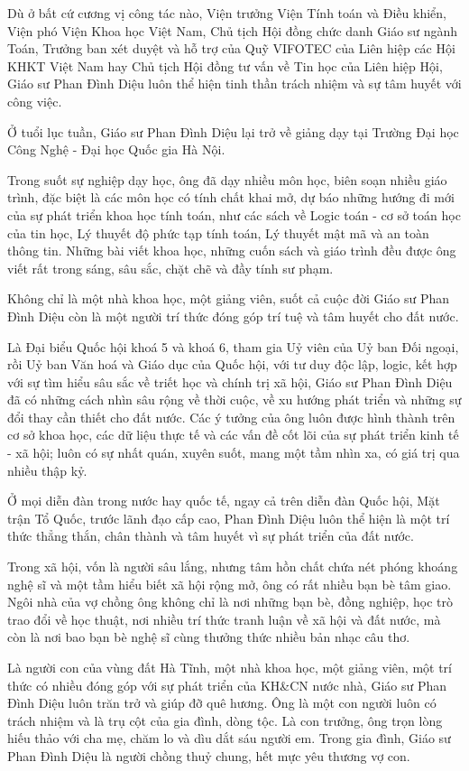 Dù ở bất cứ cương vị công tác nào, Viện trưởng Viện Tính toán và Điều khiển, Viện phó Viện Khoa học Việt Nam, Chủ tịch Hội đồng chức danh Giáo sư ngành Toán, Trưởng ban xét duyệt và hỗ trợ của Quỹ VIFOTEC của Liên hiệp các Hội KHKT Việt Nam hay Chủ tịch Hội đồng tư vấn về Tin học của Liên hiệp Hội, Giáo sư Phan Đình Diệu luôn thể hiện tinh thần trách nhiệm và sự tâm huyết với công việc.

Ở tuổi lục tuần, Giáo sư Phan Đình Diệu lại trở về giảng dạy tại Trường Đại học Công Nghệ - Đại học Quốc gia Hà Nội.

Trong suốt sự nghiệp dạy học, ông đã dạy nhiều môn học, biên soạn nhiều giáo trình, đặc biệt là các môn học có tính chất khai mở, dự báo những hướng đi mới của sự phát triển khoa học tính toán, như các sách về Logic toán - cơ sở toán học của tin học, Lý thuyết độ phức tạp tính toán, Lý thuyết mật mã và an toàn thông tin. Những bài viết khoa học, những cuốn sách và giáo trình đều được ông viết rất trong sáng, sâu sắc, chặt chẽ và đầy tính sư phạm.

Không chỉ là một nhà khoa học, một giảng viên, suốt cả cuộc đời Giáo sư Phan Đình Diệu còn là một người trí thức đóng góp trí tuệ và tâm huyết cho đất nước. 

Là Đại biểu Quốc hội khoá 5 và khoá 6, tham gia Uỷ viên của Uỷ ban Đối ngoại, rồi Uỷ ban Văn hoá và Giáo dục của Quốc hội, với tư duy độc lập, logic, kết hợp với sự tìm hiểu sâu sắc về triết học và chính trị xã hội, Giáo sư Phan Đình Diệu đã có những cách nhìn sâu rộng về thời cuộc, về xu hướng phát triển và những sự đổi thay cần thiết cho đất nước. Các ý tưởng của ông luôn được hình thành trên cơ sở khoa học, các dữ liệu thực tế và các vấn đề cốt lõi của sự phát triển kinh tế - xã hội; luôn có sự nhất quán, xuyên suốt, mang một tầm nhìn xa, có giá trị qua nhiều thập kỷ. 

Ở mọi diễn đàn trong nước hay quốc tế, ngay cả trên diễn đàn Quốc hội, Mặt trận Tổ Quốc, trước lãnh đạo cấp cao, Phan Đình Diệu luôn thể hiện là một trí thức thẳng thắn, chân thành và tâm huyết vì sự phát triển của đất nước.

Trong xã hội, vốn là người sâu lắng, nhưng tâm hồn chất chứa nét phóng khoáng nghệ sĩ và một tầm hiểu biết xã hội rộng mở, ông có rất nhiều bạn bè tâm giao. Ngôi nhà của vợ chồng ông không chỉ là nơi những bạn bè, đồng nghiệp, học trò trao đổi về học thuật, nơi nhiều trí thức tranh luận về xã hội và đất nước, mà còn là nơi bao bạn bè nghệ sĩ cùng thưởng thức nhiều bản nhạc câu thơ.

Là người con của vùng đất Hà Tĩnh, một nhà khoa học, một giảng viên, một trí thức có nhiều đóng góp với sự phát triển của KH\&CN nước nhà, Giáo sư Phan Đình Diệu luôn trăn trở và giúp đỡ quê hương. Ông là một con người luôn có trách nhiệm và là trụ cột của gia đình, dòng tộc. Là con trưởng, ông trọn lòng hiếu thảo với cha mẹ, chăm lo và dìu dắt sáu người em. Trong gia đình, Giáo sư Phan Đình Diệu là người chồng thuỷ chung, hết mực yêu thương vợ con.

